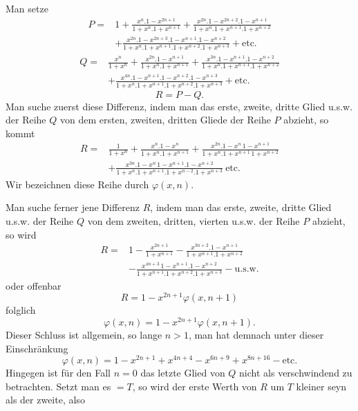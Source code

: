 \begingroup
{}
\par\indent Man setze
\[\begin{aligned}
P={}&1+\frac{x^n.1-x^{2n+1}}{1+x^n.1+x^{n+1}}
+\frac{x^{2n}.1-x^{2n+2}.1-x^{n+1}}{1+x^n.1+x^{n+1}.1+x^{n+2}}\\
&+\frac{x^{2n}.1-x^{2n+3}.1-x^{n+1}.1-x^{n+2}}{1+x^n.1+x^{n+1}.1+x^{n+2}.1+x^{n+3}}+\text{etc.}
\end{aligned}\]
\[\begin{aligned}
Q={}&\frac{x^n}{1+x^n}+\frac{x^{2n}.1-x^{n+1}}{1+x^n.1+x^{n+1}}
+\frac{x^{3n}.1-x^{n+1}.1-x^{n+2}}{1+x^n.1+x^{n+1}.1+x^{n+2}}\\
&+\frac{x^{4n}.1-x^{n+1}.1-x^{n+2}.1-x^{n+3}}{1+x^n.1+x^{n+1}.1+x^{n+2}.1+x^{n+3}}+\text{etc.}
\end{aligned}\]
\[R=P-Q.\]
\noindent Man suche zuerst diese Differenz, indem man das erste, zweite, dritte Glied u.s.w. der Reihe $Q$ von dem ersten, zweiten, dritten Gliede der Reihe $P$ abzieht, so kommt
\[\begin{aligned}
R={}&\frac1{1+x^n}+\frac{x^n.1-x^n}{1+x^n.1+x^{n+1}}
+\frac{x^{2n}.1-x^n\,1-x^{n+1}}{1+x^n.1+x^{n+1}\,1+x^{n+2}}\\
&+\frac{x^{3n}.1-x^n\,1-x^{n+1}.1-x^{n+2}}{1+x^n.1+x^{n+1}.1+x^{n-2}.1+x^{n+3}}\ \text{etc.}
\end{aligned}\]
\noindent Wir bezeichnen diese Reihe durch $\varphi(x,n)$.
\par\indent Man suche ferner jene Differenz $R$, indem man das erste, zweite, dritte Glied u.s.w. der Reihe $Q$ von dem zweiten, dritten, vierten u.s.w. der Reihe $P$ abzieht, so wird
\[\begin{aligned}
R={}&1-\frac{x^{2n+1}}{1+x^{n+1}}-\frac{x^{3n+2}.1-x^{n+1}}{1+x^{n+1}.1+x^{n+2}}\\
&-\frac{x^{4n+3}\,1-x^{n+1}.1-x^{n+2}}{1+x^{n+1}.1+x^{n+2}.1+x^{n+3}}-\text{u.s.w.}
\end{aligned}\]
\noindent oder offenbar
\[R=1-x^{2n+1}\varphi(x,n+1)\]
\noindent folglich
\[\varphi(x,n)=1-x^{2n+1}\varphi(x,n+1).\]
\noindent Dieser Schluss ist allgemein, so lange $n>1$, man hat demnach unter dieser Einschränkung
\[\varphi(x,n)=1-x^{2n+1}+x^{4n+4}-x^{6n+9}+x^{8n+16}-\text{etc.}\]
\noindent Hingegen ist für den Fall $n=0$ das letzte Glied von $Q$ nicht als verschwindend zu betrachten. Setzt man es $=T$, so wird der erste Werth von $R$ um $T$ kleiner seyn als der zweite, also
\clearpage
{}
